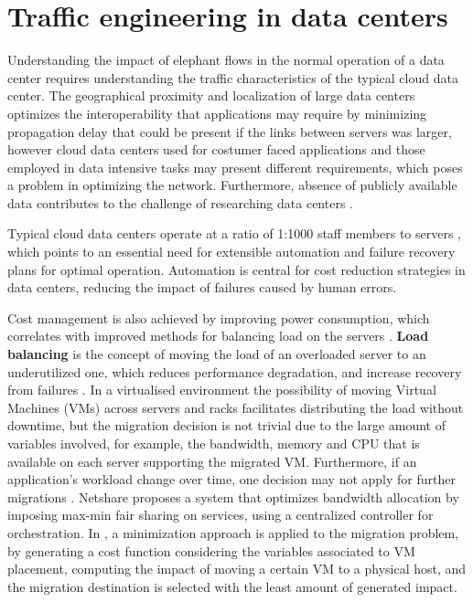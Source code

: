 \section {Traffic engineering in data centers}

Understanding the impact of elephant flows in the normal operation of a data center requires understanding the traffic characteristics of the typical cloud 
data center. The geographical proximity and localization of large data centers optimizes the interoperability that applications may require by minimizing 
propagation delay that could be present if the links between servers was larger, however cloud data centers used for costumer faced applications and those employed
in data intensive tasks may present different requirements, which poses a problem in optimizing the network. Furthermore, absence of publicly available data
contributes to the challenge of researching data centers \cite{benson_network_2010}.

\par Typical cloud data centers operate at a ratio of 1:1000 staff members to servers \cite{greenberg_cost_2008}, which points to an essential need for 
extensible automation and failure recovery plans for optimal operation. Automation is central for cost reduction strategies in data centers, reducing the 
impact of failures caused by human errors.

\par Cost management is also achieved by improving power consumption, which correlates with improved methods for balancing load on the servers 
\cite{meng_improving_2010}. \textbf{Load balancing} is the concept of moving the load of an overloaded server to an underutilized one,
which reduces performance degradation, and increase recovery from failures \cite{singh_server-storage_2008}. In a virtualised environment the possibility
of moving Virtual Machines (VMs) across servers and racks facilitates distributing the load without downtime, but the migration decision is not trivial due to the
large amount of variables involved, for example, the bandwidth, memory and CPU that is available on each server supporting the migrated VM. Furthermore, if an
application's workload change over time, one decision may not apply for further migrations \cite{xu_multi-objective_2010}. Netshare
\cite{radhakrishnan_netshare_2012} proposes a system that optimizes bandwidth allocation by imposing max-min fair sharing on services, using a 
centralized controller for orchestration. In \cite{shrivastava_application-aware_2011}, a minimization approach is applied to the migration problem, by generating
a cost function considering the variables associated to VM placement, computing the impact of moving a certain VM to a physical host, and the migration destination
is selected with the least amount of generated impact.

